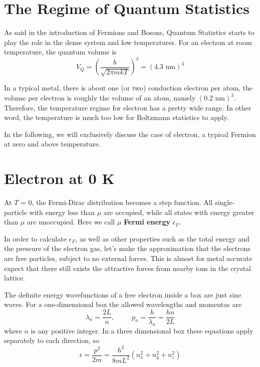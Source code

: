 
\section{The Regime of Quantum Statistics}
As said in the introduction of Fermions and Bosons, Quantum Statistics starts to play the role in the dense system and low temperatures.
For an electron at room temperature, the quantum volume is
\begin{equation}
V_Q = (\frac{h}{\sqrt{2\pi mkT}})^3 = (\textrm{4.3~nm})^3
\end{equation}

In a typical metal, there is about one (or two) conduction electron per atom, the volume per electron is roughly the volume of
an atom, namely $(\textrm{0.2 nm})^3$. Therefore, the temperature regime for electron has a pretty wide range. 
In other word, the temperature is much too low for Boltzmann statistics to apply.

In the following, we will exclusively discuss the case of electron, a typical Fermion at zero and above temperature.

\section{Electron at 0 K}
At $T$ = 0, the Fermi-Dirac distribution becomes a step function. All single-particle with energy less than $\mu$ are occupied, while
all states with energy greater than $\mu$ are unoccupied. Here we call $\mu$ \textbf{Fermi energy} $\epsilon_F$.

In order to calculate $\epsilon_F$, as well as other properties such as the total energy and the pressure of the electron gas,
let's make the approximation that the electrons are free particles, subject to no external forces. 
This is almost for metal accurate expect that there still exists the attractive forces from nearby ions in the crystal lattice.

The definite energy wavefunctions of a free electron inside a box are just sine waves. For a one-dimensional box the allowed wavelengths and momentas are
\begin{equation}
\lambda_n = \frac{2L}{n}, ~~~~~~~~~~~ p_n = \frac{h}{\lambda_n} = \frac{hn}{2L}
\end{equation}
where $n$ is any positive integer. In a three dimensional box these equations apply separately to each direction, so
\begin{equation}
\epsilon = \frac{p^2}{2m} = \frac{h^2}{8mL^2}(n_x^2+n_y^2+n_z^2)
\end{equation}


